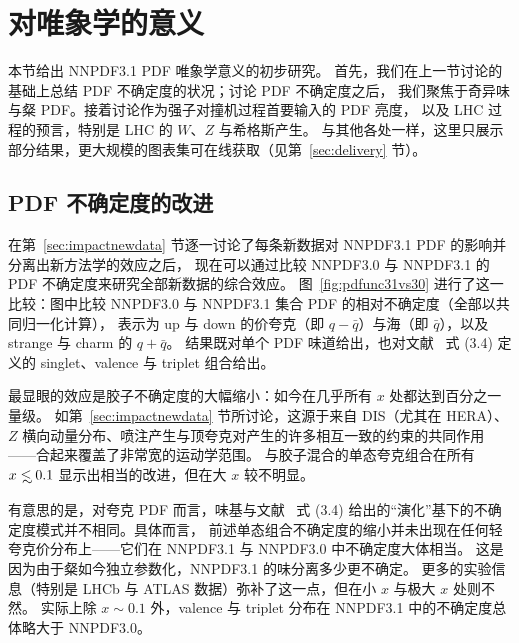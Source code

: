 \section{对唯象学的意义}
\label{sec:pheno}

本节给出 NNPDF3.1 PDF 唯象学意义的初步研究。
%
首先，我们在上一节讨论的基础上总结 PDF 不确定度的状况；讨论 PDF 不确定度之后，
我们聚焦于奇异味与粲 PDF。接着讨论作为强子对撞机过程首要输入的 PDF 亮度，
以及 LHC 过程的预言，特别是 LHC 的 $W$、$Z$ 与希格斯产生。
与其他各处一样，这里只展示部分结果，更大规模的图表集可在线获取（见第~\ref{sec:delivery} 节）。

\subsection{PDF 不确定度的改进}

\label{sec:phenopdfs}

在第~\ref{sec:impactnewdata} 节逐一讨论了每条新数据对 NNPDF3.1 PDF 的影响并分离出新方法学的效应之后，
现在可以通过比较 NNPDF3.0 与 NNPDF3.1 的 PDF 不确定度来研究全部新数据的综合效应。
图~\ref{fig:pdfunc31vs30} 进行了这一比较：图中比较 NNPDF3.0 与
NNPDF3.1 集合 PDF 的相对不确定度（全部以共同归一化计算），
表示为 up 与 down 的价夸克（即 $q-\bar q$）与海（即 $\bar q$），以及 strange 与 charm 的 $q+\bar q$。
结果既对单个 PDF 味道给出，也对文献~\cite{Ball:2016neh} 式 (3.4) 定义的 singlet、valence 与 triplet 组合给出。

最显眼的效应是胶子不确定度的大幅缩小：如今在几乎所有 $x$ 处都达到百分之一量级。
如第~\ref{sec:impactnewdata} 节所讨论，这源于来自 DIS（尤其在 HERA）、$Z$ 横向动量分布、喷注产生与顶夸克对产生的许多相互一致的约束的共同作用——合起来覆盖了非常宽的运动学范围。
与胶子混合的单态夸克组合在所有 $x\lsim 0.1$ 显示出相当的改进，但在大 $x$ 较不明显。

有意思的是，对夸克 PDF 而言，味基与文献~\cite{Ball:2016neh} 式 (3.4) 给出的“演化”基下的不确定度模式并不相同。具体而言，
前述单态组合不确定度的缩小并未出现在任何轻夸克价分布上——它们在 NNPDF3.1 与 NNPDF3.0 中不确定度大体相当。
这是因为由于粲如今独立参数化，NNPDF3.1 的味分离多少更不确定。
更多的实验信息（特别是 LHCb 与 ATLAS 数据）弥补了这一点，但在小 $x$ 与极大 $x$ 处则不然。
实际上除 $x\sim0.1$ 外，valence 与 triplet 分布在 NNPDF3.1 中的不确定度总体略大于 NNPDF3.0。

